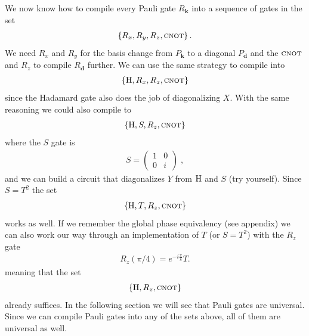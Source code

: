 We now know how to compile every Pauli gate $R_\mathbf{k}$ into a sequence of gates in the set 
\begin{align}
    \left\{R_x,R_y,R_z, \textsc{cnot}\right\}.
\end{align}
We need $R_x$ and $R_y$ for the basis change from $P_\mathbf{k}$ to a diagonal $P_\mathbf{d}$ and the $\textsc{cnot}$ and $R_z$ to compile $R_\mathbf{d}$ further.
We can use the same strategy to compile into
\begin{align}
     \left\{\operatorname{H}, R_x,R_z, \textsc{cnot}\right\} 
\end{align}
since the Hadamard gate also does the job of diagonalizing $X$.
With the same reasoning we could also compile to
\begin{align}
     \left\{\operatorname{H}, S ,R_z, \textsc{cnot}\right\} 
\end{align}
where the $S$ gate is
\begin{align}
    S = \begin{pmatrix}
        1 & 0 \\ 0 & i
    \end{pmatrix}\;,
\end{align}
and we can build a circuit that diagonalizes $Y$ from $\operatorname{H}$ and $S$ (try yourself). Since $S = T^2$ the set
\begin{align}
     \left\{\operatorname{H}, T ,R_z, \textsc{cnot}\right\} 
\end{align}
works as well.
If we remember the global phase equivalency (see appendix) we can also work our way through an implementation of $T$ (or $S=T^2$) with the $R_z$ gate
\begin{align}
    R_z(\pi/4) = e^{-i\frac{\pi}{8}} T.
\end{align}
meaning that the set 
\begin{align}
     \left\{\operatorname{H}, R_z, \textsc{cnot}\right\}\label{eq:H,Rz,cnot} 
\end{align}
already suffices.
In the following section we will see that Pauli gates are universal. Since we can compile Pauli gates into any of the sets above, all of them are universal as well.

